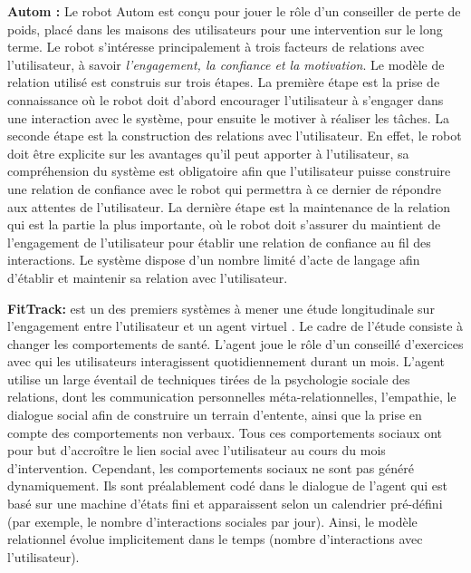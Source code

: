 \documentclass [french]{sig-alternate-05-2015}
\begin{document}
\par \textbf{Autom :} Le robot Autom \cite{kidd2005sociable} est conçu pour jouer le rôle d'un conseiller de perte de poids, placé dans les maisons des utilisateurs pour une intervention sur le long terme. Le robot s'intéresse principalement à trois facteurs de relations avec l'utilisateur, à savoir \textit{l'engagement, la confiance et la motivation}.  Le modèle de relation utilisé est construis sur trois étapes. La première étape est la prise de connaissance où le robot doit  d'abord encourager l'utilisateur à s'engager dans une interaction avec le système, pour ensuite le motiver à réaliser les tâches.
La seconde étape est la construction des relations avec l'utilisateur. En effet, le robot doit être explicite sur les avantages qu'il peut apporter à l'utilisateur, sa compréhension du système est obligatoire afin que l'utilisateur puisse construire une relation de confiance avec le robot qui permettra à ce dernier de répondre aux attentes de l'utilisateur.  La dernière étape est la maintenance de la relation qui est la partie la plus importante, où le robot doit s'assurer du maintient de l'engagement de l'utilisateur pour établir une relation de confiance au fil des interactions. Le système dispose  d'un nombre limité d'acte de langage afin d'établir et maintenir sa relation avec l'utilisateur.


\par \textbf{FitTrack: } est un des premiers systèmes à mener une étude longitudinale sur l'engagement entre l'utilisateur et un agent virtuel \cite{bickmore2005s}. Le cadre de l'étude consiste à changer les comportements de santé. L'agent joue le rôle d'un conseillé d'exercices avec qui les utilisateurs interagissent quotidiennement durant un mois. L'agent utilise un large éventail de techniques tirées de la psychologie sociale des relations, dont les communication personnelles méta-relationnelles, l'empathie, le dialogue social afin de construire un terrain d'entente, ainsi que la prise en compte des comportements non verbaux. Tous ces comportements sociaux ont pour but d’accroître le lien social avec l'utilisateur au cours du mois d'intervention.
 Cependant, les comportements sociaux ne sont pas généré dynamiquement. Ils sont préalablement codé dans le dialogue de l'agent qui est basé sur une machine d'états fini et apparaissent selon un calendrier pré-défini (par exemple, le nombre d'interactions sociales par jour). Ainsi, le modèle relationnel évolue implicitement dans le temps (nombre d'interactions avec l'utilisateur).
\end{document}
